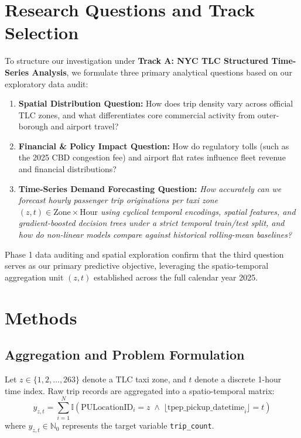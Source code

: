 \documentclass[11pt,a4paper]{article}
\begin{document}
\section{Research Questions and Track Selection}
To structure our investigation under \textbf{Track A: NYC TLC Structured Time-Series Analysis}, we formulate three primary analytical questions based on our exploratory data audit:
\begin{enumerate}
    \item \textbf{Spatial Distribution Question:} How does trip density vary across official TLC zones, and what differentiates core commercial activity from outer-borough and airport travel?
    \item \textbf{Financial \& Policy Impact Question:} How do regulatory tolls (such as the 2025 CBD congestion fee) and airport flat rates influence fleet revenue and financial distributions?
    \item \textbf{Time-Series Demand Forecasting Question:} \textit{How accurately can we forecast hourly passenger trip originations per taxi zone $(z,t) \in \text{Zone} \times \text{Hour}$ using cyclical temporal encodings, spatial features, and gradient-boosted decision trees under a strict temporal train/test split, and how do non-linear models compare against historical rolling-mean baselines?}
\end{enumerate}
Phase 1 data auditing and spatial exploration confirm that the third question serves as our primary predictive objective, leveraging the spatio-temporal aggregation unit $(z,t)$ established across the full calendar year 2025.

\section{Methods}

\subsection{Aggregation and Problem Formulation}
Let $z \in \{1, 2, \dots, 263\}$ denote a TLC taxi zone, and $t$ denote a discrete 1-hour time index. Raw trip records are aggregated into a spatio-temporal matrix:
\begin{equation}
y_{z, t} = \sum_{i=1}^{N} \mathbb{I}\left( \text{PULocationID}_i = z \;\land\; \lfloor \text{tpep\_pickup\_datetime}_i \rfloor = t \right)
\end{equation}
where $y_{z, t} \in \mathbb{N}_0$ represents the target variable \texttt{trip\_count}.
\end{document}
